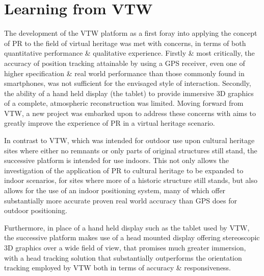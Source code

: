 

\section{Learning from VTW}
The development of the VTW platform as a first foray into applying the concept of PR to the field of virtual heritage was met with concerns, in terms of both quantitative performance \& qualitative experience. Firstly \& most critically, the accuracy of position tracking attainable by using a GPS receiver, even one of higher specification \& real world performance than those commonly found in smartphones, was not sufficient for the envisaged style of interaction. Secondly, the ability of a hand held  display (the tablet) to provide immersive 3D graphics of a complete, atmospheric reconstruction was limited. Moving forward from VTW, a new project was embarked upon to address these concerns with aims to greatly improve the experience of PR in a virtual heritage scenario.

In contrast to VTW, which was intended for outdoor use upon cultural heritage sites where either no remnants or only parts of original structures still stand, the successive platform is intended for use indoors. This not only allows the investigation of the application of PR to cultural heritage to be expanded to indoor scenarios, for sites where more of a historic structure still stands, but also allows for the use of an indoor positioning system, many of which offer substantially more accurate proven real world accuracy than GPS does for outdoor positioning.

Furthermore, in place of a hand held display such as the tablet used by VTW, the successive platform makes use of a head mounted display offering stereoscopic 3D graphics over a wide field of view, that promises much greater immersion, with a head tracking solution that substantially outperforms the orientation tracking employed by VTW both in terms of accuracy \& responsiveness.



